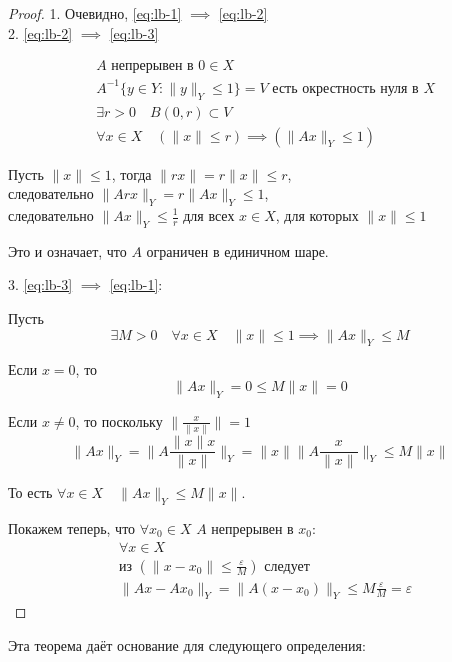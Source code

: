 \begin{proof}

1. Очевидно, \eqref{eq:lb-1} $\implies$ \eqref{eq:lb-2} \\

2. \eqref{eq:lb-2} $\implies$ \eqref{eq:lb-3} 

\begin{align*}
& A \text{ непрерывен в } 0\in X \\
& A^{-1}\{y\in Y: \|y\|_Y \leq 1\} = V\text{ есть окрестность нуля в } X \\
& \exists r>0 \quad B(0, r)\subset V \\
& \forall x\in X \quad (\|x\| \leq r) \implies (\|A x\|_Y \leq 1)
\end{align*}

Пусть $\|x\|\leq 1$, тогда $\|rx\| = r\|x\| \leq r$,\\
следовательно ${\|A rx\|_Y = r \|A x\|_Y \leq 1}$,\\
следовательно ${\|A x\|_Y \leq \frac{1}{r}}$
для всех $x\in X$, для которых $\|x\|\leq 1$

Это и означает, что $A$ ограничен в единичном шаре.

3. \eqref{eq:lb-3} $\implies$ \eqref{eq:lb-1}:

Пусть
 $$\exists M>0 \quad \forall x\in X \quad \|x\|\leq 1 \implies \|A x\|_Y \leq M$$

Если $x=0$, то $$\|A x\|_Y = 0 \leq M\|x\| = 0$$

Если $x\neq 0$, то поскольку  $\|\frac{x}{\|x\|}\|=1$
$$\|A x\|_Y = \|A \frac{\|x\|x}{\|x\|}\|_Y = \|x\| \|A \frac{x}{\|x\|}\|_Y \leq M \|x\|$$

То есть $\forall x\in X \quad \|A x\|_Y \leq M \|x\|$.

Покажем теперь, что $\forall x_0\in X$ $A$ непрерывен в $x_0$:
\begin{align*}
& \forall x\in X\\
& \text{из } (\|x - x_0\| \leq \frac{\varepsilon}{M}) \text{ следует } \\
& \|A x - A x_0\|_Y = \|A (x - x_0)\|_Y \leq M \frac{\varepsilon}{M} = \varepsilon
\end{align*}

\end{proof}

Эта теорема даёт основание для следующего определения:

